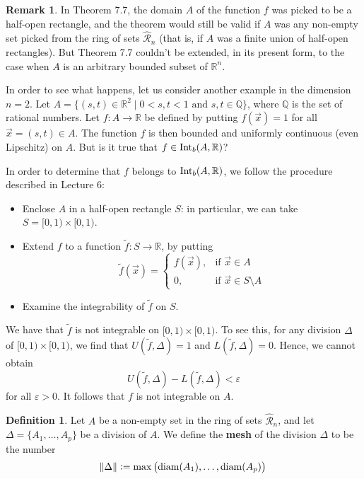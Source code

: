 \documentclass[11pt]{article}
\theoremstyle{definition}
\newtheorem{defn}[thm]{Definition}
\newtheorem{remark}[thm]{Remark}
\newcommand{\Q}{\ensuremath{\mathbb{Q}}}
\newcommand{\R}{\ensuremath{\mathbb{R}}}
\begin{document}
\begin{remark}
In Theorem 7.7, the domain $A$ of the function $f$ was picked to be a half-open rectangle, and the theorem would still be valid if $A$ was any non-empty set picked from the ring of sets $\widehat{\mathcal{R}}_n$ (that is, if $A$ was a finite union of half-open rectangles). But Theorem 7.7 couldn't be extended, in its present form, to the case when $A$ is an arbitrary bounded subset of $\R^n$. 

In order to see what happens, let us consider another example in the dimension $n = 2$. Let $A = \{(s, t) \in \R^2 \mid 0 < s, t < 1 \text{ and } s, t \in \Q\}$, where $\Q$ is the set of rational numbers. Let $f : A \to \R$ be defined by putting $f(\vec{x}) = 1$ for all $\vec{x} = (s, t) \in A$. The function $f$ is then bounded and uniformly continuous (even Lipschitz) on $A$. But is it true that $f \in {\rm Int}_b(A, \R)$? 

In order to determine that $f$ belongs to ${\rm Int}_b(A, \R)$, we follow the procedure described in Lecture 6:\vspace{-1.5ex} 
\begin{itemize}
\item Enclose $A$ in a half-open rectangle $S$: in particular, we can take $S = [0, 1) \times [0, 1)$.
\item Extend $f$ to a function $\widetilde{f} : S \to \R$, by putting
$$\widetilde{f}(\vec{x}) = \begin{cases} f(\vec{x}), & \text{if } \vec{x} \in A \\ 0, & \text{if } \vec{x} \in S \setminus A \end{cases}$$
\item Examine the integrability of $\widetilde{f}$ on $S$. 
\end{itemize}
\vspace{-1.5ex}
We have that $\widetilde{f}$ is not integrable on $[0, 1) \times [0, 1)$. To see this, for any division $\Delta$ of $[0, 1) \times [0, 1)$, we find that $U(\widetilde{f}, \Delta) = 1$ and $L(\widetilde{f}, \Delta) = 0$. Hence, we cannot obtain
$$U(\widetilde{f}, \Delta) - L(\widetilde{f}, \Delta) < \varepsilon$$
for all $\varepsilon > 0$. It follows that $f$ is not integrable on $A$. 
\end{remark}

\begin{defn}
Let $A$ be a non-empty set in the ring of sets $\widehat{\mathcal{R}}_n$, and let $\Delta = \{A_1, \dots, A_p\}$ be a division of $A$. We define the {\bf mesh} of the division $\Delta$ to be the number
$$\norm{\Delta} := \max\left( {\rm diam}(A_1), \dots, {\rm diam}(A_p) \right)$$
\end{defn}
\end{document}
